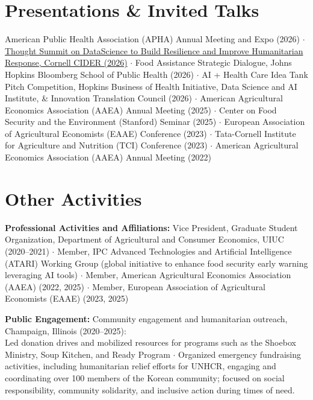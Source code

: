 \documentclass[a4paper,11pt]{article}
\begin{document}
\section{\textbf{Presentations \& Invited Talks}}
\vspace{-0.4mm}
American Public Health Association (APHA) Annual Meeting and Expo (2026) $\cdot$  
\href{https://thoughtsummits.cornell.edu/summit/data-science-to-build-resilience-and-improve-humanitarian-response/}{Thought Summit on DataScience to Build Resilience and Improve Humanitarian Response, Cornell CIDER (2026)} $\cdot$  
Food Assistance Strategic Dialogue, Johns Hopkins Bloomberg School of Public Health (2026) $\cdot$  
AI + Health Care Idea Tank Pitch Competition, Hopkins Business of Health Initiative, Data Science and AI Institute, \& Innovation Translation Council (2026) $\cdot$  
American Agricultural Economics Association (AAEA) Annual Meeting (2025) $\cdot$  
Center on Food Security and the Environment (Stanford) Seminar (2025) $\cdot$  
European Association of Agricultural Economists (EAAE) Conference (2023) $\cdot$  
Tata-Cornell Institute for Agriculture and Nutrition (TCI) Conference (2023) $\cdot$  
American Agricultural Economics Association (AAEA) Annual Meeting (2022)



\section*{\textbf{Other Activities}}
\vspace{-0.4mm}

\textbf{Professional Activities and Affiliations:} 
Vice President, Graduate Student Organization, Department of Agricultural and Consumer Economics, UIUC (2020--2021) $\cdot$ 
Member, IPC Advanced Technologies and Artificial Intelligence (ATARI) Working Group (global initiative to enhance food security early warning leveraging AI tools) $\cdot$ 
Member, American Agricultural Economics Association (AAEA) (2022, 2025) $\cdot$ 
Member, European Association of Agricultural Economists (EAAE) (2023, 2025)

\textbf{Public Engagement:}
Community engagement and humanitarian outreach, Champaign, Illinois (2020--2025): \\ 
Led donation drives and mobilized resources for programs such as the Shoebox Ministry, Soup Kitchen, and Ready Program $\cdot$ 
Organized emergency fundraising activities, including humanitarian relief efforts for UNHCR, engaging and coordinating over 100 members of the Korean community; focused on social responsibility, community solidarity, and inclusive action during times of need.
\end{document}
